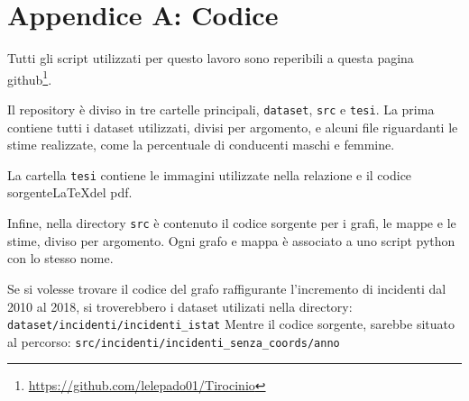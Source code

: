 \documentclass[a4paper,12pt]{report}
\newcommand{\columnstyle}[1]{\texttt{#1}}
\newcommand{\skipline}{\vspace{0.2in}}
\begin{document}

\appendix
\chapter{Appendice A: Codice}

Tutti gli script utilizzati per questo lavoro sono reperibili a questa pagina 
github\footnote{\url{https://github.com/lelepado01/Tirocinio}}.

Il repository è diviso in tre cartelle principali, \columnstyle{dataset}, \columnstyle{src} 
e \columnstyle{tesi}. La prima contiene tutti i dataset utilizzati, divisi per 
argomento, e alcuni file riguardanti le stime realizzate, come la percentuale di 
conducenti maschi e femmine.

La cartella \columnstyle{tesi} contiene le immagini utilizzate nella relazione e il codice 
sorgente\LaTeX del pdf.

Infine, nella directory \columnstyle{src} è contenuto il codice sorgente per i grafi, 
le mappe e le stime, diviso per argomento. Ogni grafo e mappa è associato a uno script python 
con lo stesso nome.

Se si volesse trovare il codice del grafo raffigurante l'incremento di incidenti 
dal 2010 al 2018, si troverebbero i dataset utilizati nella directory:
\skipline
\indent\columnstyle{dataset/incidenti/incidenti\_istat}
\skipline
Mentre il codice sorgente, sarebbe situato al percorso:
\skipline
\indent\columnstyle{src/incidenti/incidenti\_senza\_coords/anno}

\printbibliography
\end{document}
